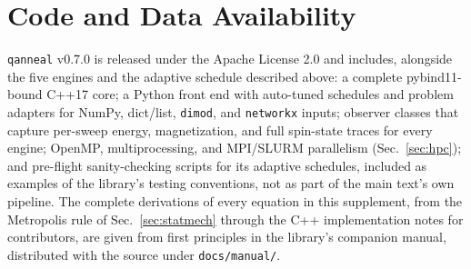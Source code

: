 \documentclass[11pt]{article}
\begin{document}
\section{Code and Data Availability}
\label{sec:availability}

\texttt{qanneal} v0.7.0 is released under the Apache License 2.0 and includes, alongside the
five engines and the adaptive schedule described above: a complete pybind11-bound C++17 core; a
Python front end with auto-tuned schedules and problem adapters for NumPy, dict/list, \texttt{dimod},
and \texttt{networkx} inputs; observer classes that capture per-sweep energy, magnetization, and
full spin-state traces for every engine; OpenMP, multiprocessing, and MPI/SLURM parallelism
(Sec.~\ref{sec:hpc}); and pre-flight sanity-checking scripts for its adaptive schedules, included
as examples of the library's testing conventions, not as part of the main text's own pipeline. The
complete derivations of every equation in this supplement, from the Metropolis rule of
Sec.~\ref{sec:statmech} through the C++ implementation notes for contributors, are given from
first principles in the library's companion manual, distributed with the source under
\texttt{docs/manual/}.
\end{document}
